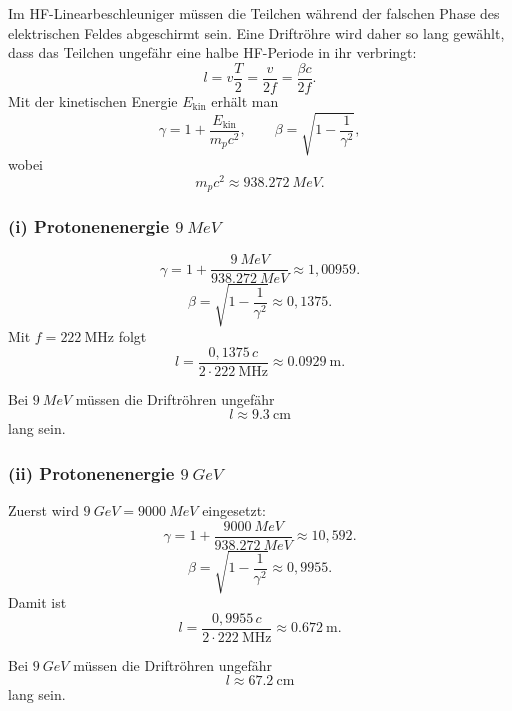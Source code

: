 \documentclass[11pt,a4paper]{scrartcl}
\newcommand{\MeV}{\si{MeV}}
\newcommand{\GeV}{\si{GeV}}
\theoremstyle{definition}
\theoremstyle{plain}
\theoremstyle{remark}
\begin{document}
\begin{definitionbox}[title=Warum Driftröhren länger werden]
Im HF-Linearbeschleuniger müssen die Teilchen während der falschen Phase des elektrischen Feldes abgeschirmt sein. Eine Driftröhre wird daher so lang gewählt, dass das Teilchen ungefähr eine halbe HF-Periode in ihr verbringt:
\[
    l = v\frac{T}{2}=\frac{v}{2f}=\frac{\beta c}{2f}.
\]
Mit der kinetischen Energie \(E_{\mathrm{kin}}\) erhält man
\[
    \gamma = 1 + \frac{E_{\mathrm{kin}}}{m_pc^2},
    \qquad
    \beta = \sqrt{1-\frac{1}{\gamma^2}},
\]
wobei
\[
    m_pc^2 \approx \SI{938,272}{\MeV}.
\]
\end{definitionbox}

\subsubsection*{(i) Protonenenergie \(\SI{9}{\MeV}\)}

\begin{calculationbox}
\[
    \gamma = 1+\frac{\SI{9}{\MeV}}{\SI{938,272}{\MeV}}
    \approx 1{,}00959.
\]
\[
    \beta = \sqrt{1-\frac{1}{\gamma^2}}
    \approx 0{,}1375.
\]
Mit \(f=\SI{222}{\mega\hertz}\) folgt
\[
    l = \frac{0{,}1375\,c}{2\cdot \SI{222}{\mega\hertz}}
    \approx \SI{0,0929}{\metre}.
\]
\end{calculationbox}

\begin{answerbox}
Bei \(\SI{9}{\MeV}\) müssen die Driftröhren ungefähr
\[
    \boxed{l\approx \SI{9,3}{\centi\metre}}
\]
lang sein.
\end{answerbox}

\subsubsection*{(ii) Protonenenergie \(\SI{9}{\GeV}\)}

\begin{calculationbox}
Zuerst wird \(\SI{9}{\GeV}=\SI{9000}{\MeV}\) eingesetzt:
\[
    \gamma = 1+\frac{\SI{9000}{\MeV}}{\SI{938,272}{\MeV}}
    \approx 10{,}592.
\]
\[
    \beta = \sqrt{1-\frac{1}{\gamma^2}}
    \approx 0{,}9955.
\]
Damit ist
\[
    l = \frac{0{,}9955\,c}{2\cdot \SI{222}{\mega\hertz}}
    \approx \SI{0,672}{\metre}.
\]
\end{calculationbox}

\begin{answerbox}
Bei \(\SI{9}{\GeV}\) müssen die Driftröhren ungefähr
\[
    \boxed{l\approx \SI{67,2}{\centi\metre}}
\]
lang sein.
\end{answerbox}
\end{document}
